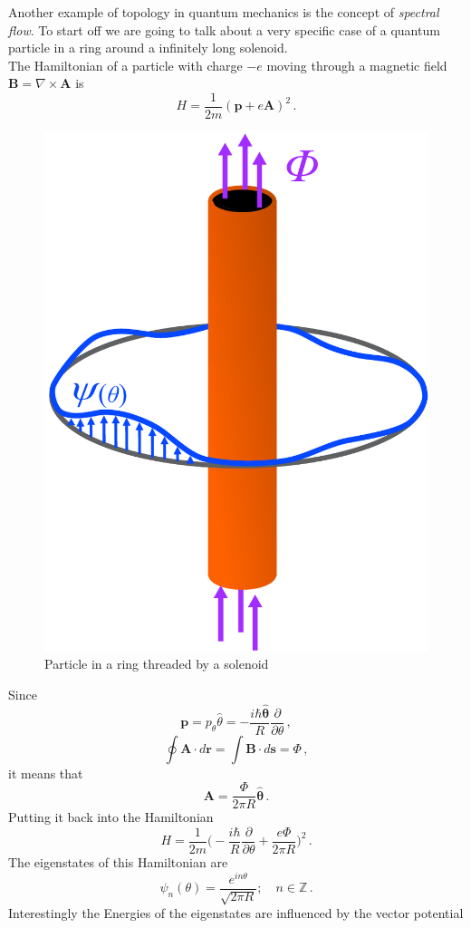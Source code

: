         
        Another example of topology in quantum mechanics is the concept of \textit{spectral flow}. To start off we are going to talk about a very specific case of a quantum particle in a ring around a infinitely long solenoid.\\
        The Hamiltonian of a particle with charge $-e$ moving through a magnetic field $\mathbf B= \nabla \times \mathbf A$ is
        \begin{equation} \label{EMHamiltonian}
                H=\frac 1{2m}(\mathbf p + e\mathbf A)^2 \,.
        \end{equation}
        \begin{figure}
            \includegraphics[width=.4\textwidth]{Immagini/topo/solenoid.pdf}
            \caption{Particle in a ring threaded by a solenoid}
        \end{figure} 
        Since 
        \[
            \mathbf p=p_\theta \hat\theta=-\frac{i\hbar\mathbf {\hat \theta}}{R}\frac\partial {\partial \theta}\,,
        \]
        \[
            \oint \mathbf A\cdot d\mathbf r=\int \mathbf B\cdot d\mathbf s = \Phi\,,
        \]   
        it means that
        \begin{equation} \label{vector_potential}
            \mathbf A=\frac \Phi{2\pi R} \mathbf {\hat \theta}\,.
        \end{equation}
        Putting it back into the Hamiltonian
        \begin{equation} \label{EMHamiltonian2}
            H=\frac 1{2m}\bigg(-\frac{i\hbar}{R}\frac\partial {\partial \theta} + \frac{e\Phi}{2\pi R}\bigg)^2 \,.
        \end{equation}
        The eigenstates of this Hamiltonian are 
        \[
            \psi_n(\theta)=\frac {e^{in\theta}} {\sqrt{2\pi R}}; \quad n\in \mathbb Z\,.
        \]
        Interestingly the Energies of the eigenstates are influenced by the vector potential
